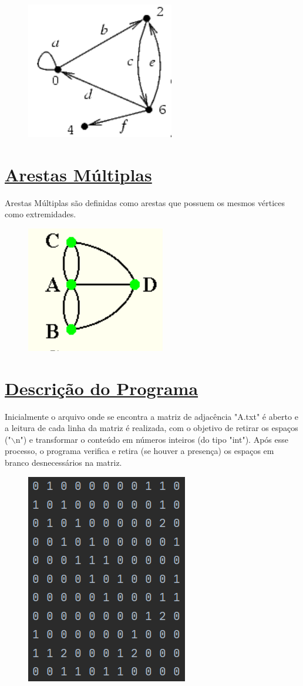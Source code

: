 \documentclass{article}
\begin{document}
\begin{figure}[H]
	\centering
	\includegraphics[width=0.2\linewidth]{"Figuras/laco"}
	\label{fig:laco}
\end{figure}
	\newpage	
	\section{{\Large \underline{Arestas Múltiplas}}}
		Arestas Múltiplas são definidas como arestas que possuem os mesmos vértices como extremidades.
		
\begin{figure}[H]
	\centering
	\includegraphics[width=0.2\linewidth]{"Figuras/arestasm"}
	\label{fig:arestasm}
\end{figure}\vspace*{0.5cm}

	\section{{\Large \underline{Descrição do Programa}}}
	
	Inicialmente o arquivo onde se encontra a matriz de adjacência "A.txt" é aberto e a leitura de cada linha da matriz é realizada, com o objetivo de retirar os espaços ("$\backslash$n") e transformar o conteúdo em números inteiros (do tipo "int"). Após esse processo, o programa verifica e retira (se houver a presença) os espaços em branco desnecessários na matriz.
	
\begin{figure}[H]
	\centering
	\includegraphics[width=0.2\linewidth]{"Figuras/Entrada - Matriz"}
	\label{fig:entradamatriz}
\end{figure}
\end{document}
